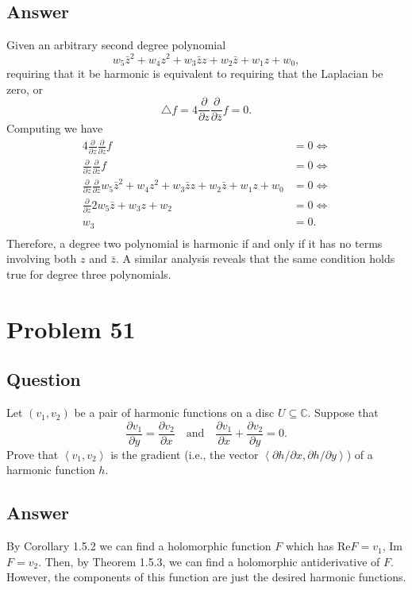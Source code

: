 \documentclass[11pt]{article}
\begin{document}
\subsection{Answer}
Given an arbitrary second degree polynomial
\[w_5 \bar z^2 + w_4 z^2 + w_3 \bar z z + w_2 \bar z +w_1 z +w_0,\]
requiring that it be harmonic is equivalent to requiring that the Laplacian be zero, or 
\[ \triangle f = 4 \frac{\partial}{\partial z} \frac{\partial }{\partial \bar z} f = 0 .\]
Computing we have
\begin{align*}
4 \frac{\partial}{\partial z} \frac{\partial }{\partial \bar z} f &= 0 \Leftrightarrow \\
 \frac{\partial}{\partial z} \frac{\partial }{\partial \bar z} f &= 0 \Leftrightarrow \\
  \frac{\partial}{\partial z} \frac{\partial }{\partial \bar z} w_5 \bar z^2 + w_4 z^2 + w_3 \bar z z + w_2 \bar z +w_1 z +w_0 &= 0 \Leftrightarrow \\
  \frac{\partial}{\partial z} 2 w_5 \bar z  + w_3 z + w_2   &= 0 \Leftrightarrow \\
 w_3  &= 0 .\\
\end{align*}
Therefore, a degree two polynomial is harmonic if and only if it has no terms involving both $z$ and $\bar z$. A similar analysis reveals that the same condition holds true for degree three polynomials.

\section{Problem  51}
\subsection{Question}
Let $(v_1,v_2)$ be a pair of harmonic functions on a disc $U \subseteq \mathbb{C}$. Suppose that
\[\frac{\partial v_1}{\partial y} = \frac{\partial v_2}{\partial x} \quad \mbox{and} \quad \frac{\partial v_1}{\partial x} + \frac{\partial v_2}{\partial y} = 0.\]
Prove that $\left<v_1, v_2\right>$ is the gradient (i.e., the vector $\left< \partial h/\partial x , \partial h/ \partial y\right>$) of a harmonic function $h$.
\subsection{Answer}
By Corollary 1.5.2 we can find a holomorphic function $F$ which has Re$F = v_1$, Im$F = v_2$. Then, by Theorem 1.5.3, we can find a holomorphic antiderivative of $F$. However, the components of this function are just the desired harmonic functions.
\end{document}
